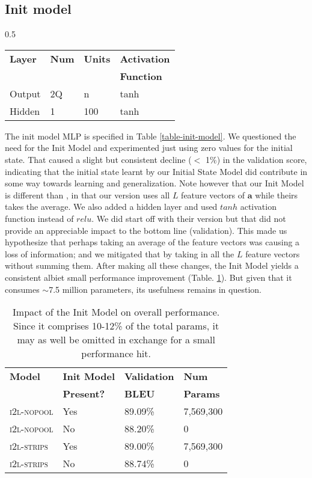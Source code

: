\documentclass{article}
\begin{document}
\subsection{Init model}
\label{init-model-comments}
\begin{wraptable}{}{0.5\textwidth}
	\caption{Init Model layers.}
	\begin{tabular}{llll}
		\textbf{Layer} & \textbf{Num} & \textbf{Units} & \textbf{Activation} \\
		&&&\textbf{Function}\\
		\hline
		Output & 2Q & n & tanh \\
		Hidden & 1 & 100 & tanh
	\end{tabular}
	\centering
	\label{table-init-model}
\end{wraptable}
The init model MLP is specified in Table \ref{table-init-model}. We questioned the need for the Init Model and experimented just using zero values for the initial state. That caused a slight but consistent decline ($<$ 1\%) in the validation score, indicating that the initial state learnt by our Initial State Model did contribute in some way towards learning and generalization. Note however that our Init Model is different than \citealp{Xu2015ShowAA}, in that our version uses all $L$ feature vectors of $\boldsymbol{a}$ while theirs takes the average. We also added a hidden layer and used $tanh$ activation function instead of $relu$. We did start off with their version but that did not provide an appreciable impact to the bottom line (validation). This made us hypothesize that perhaps taking an average of the feature vectors was causing a loss of information; and we mitigated that by taking in all the $L$ feature vectors without summing them. After making all these changes, the Init Model yields a consistent albiet small performance improvement (Table. \ref{table-init-efficacy}). But given that it consumes $\sim$7.5 million parameters, its usefulness remains in question.
\begin{table}[h]
\caption{Impact of the Init Model on overall performance. Since it comprises 10-12\% of the total params, it may as well be omitted in exchange for a small performance hit.}
	\begin{tabular}{llll}
		\textbf{Model} & \textbf{Init Model} & \textbf{Validation} & \textbf{Num}\\
		& \textbf{Present?} & \textbf{BLEU} & \textbf{Params} \\
		\hline
		\textsc{i2l-nopool} & Yes & 89.09\% & 7,569,300 \\
		\textsc{i2l-nopool} & No & 88.20\% & 0\\
		\textsc{i2l-strips} & Yes & 89.00\% & 7,569,300 \\
		\textsc{i2l-strips} & No & 88.74\% & 0
	\end{tabular}
	\centering
	\label{table-init-efficacy}
\end{table}
\end{document}
